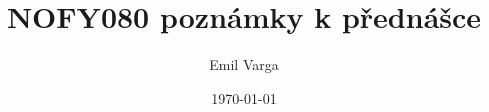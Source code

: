 \documentclass{article}
\title{NOFY080 poznámky k přednášce}
\author{Emil Varga}
\date{\today}
\newcommand{\ls}[1]{\lstinline{#1}}
\begin{document}
\maketitle

\tableofcontents
\listofintermezzos
\lstlistoflistings







% 
% 
% 



\newpage
\appendix

\end{document}

